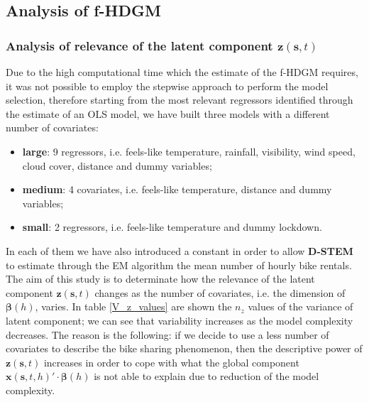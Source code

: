 \subsection{Analysis of f-HDGM}

\subsubsection{Analysis of relevance of the latent component $\boldsymbol{z}(\boldsymbol{s}, t)$}
 Due to the high computational time which the estimate of the f-HDGM requires, it was not possible to employ the stepwise approach to perform the model selection, therefore starting from the most relevant regressors identified through the estimate of an OLS model, we have built three models with a different number of covariates:
\begin{itemize}
	\item \textbf{large}: \num{9} regressors, i.e. feels-like temperature, rainfall, visibility, wind speed, cloud cover, distance and dummy variables; 
	\item \textbf{medium}: \num{4} covariates, i.e. feels-like temperature, distance and dummy variables;
	\item \textbf{small}: \num{2} regressors, i.e. feels-like temperature and dummy lockdown.
\end{itemize}
 In each of them we have also introduced a constant in order to allow \textbf{D-STEM} to estimate through the EM algorithm the mean number of hourly bike rentals. The aim of this study is to determinate how the relevance of the latent component $\boldsymbol{z}(\boldsymbol{s}, t)$ changes as the number of covariates, i.e. the dimension of $\boldsymbol{\beta}(h)$, varies. In table \ref{V_z_values} are shown the $n_z$ values of the variance of latent component; we can see that variability increases as the model complexity decreases. The reason is the following: if we decide to use a less number of covariates to describe the bike sharing phenomenon, then the descriptive power of $\boldsymbol{z}(\boldsymbol{s}, t)$ increases in order to cope with what the global component $\boldsymbol{x}(\boldsymbol{s}, t, h)' \cdot \boldsymbol{\beta}(h)$ is not able to explain due to reduction of the model complexity.
 
